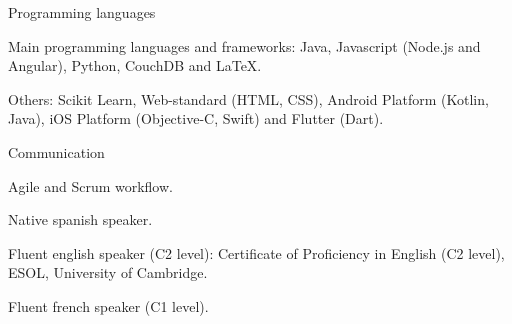 

\begin{cventries}

\cventry
{Programming languages} %
{} %
{} %
{} %
{
  \begin{cvitems} %
    \item Main programming languages and frameworks: Java, Javascript (Node.js and Angular), Python, CouchDB and \LaTeX.
    \item Others: Scikit Learn, Web-standard (HTML, CSS), Android Platform (Kotlin, Java), iOS Platform (Objective-C, Swift) and Flutter (Dart).
  \end{cvitems}
}

\cventry
{Communication} %
{} %
{} %
{} %
{
  \begin{cvitems} %
    \item Agile and Scrum workflow.
    \item Native spanish speaker. 
    \item Fluent english speaker (C2 level): Certificate of Proficiency in English (C2 level), ESOL, University of Cambridge.
    \item Fluent french speaker (C1 level).
  \end{cvitems}
}

\end{cventries}
